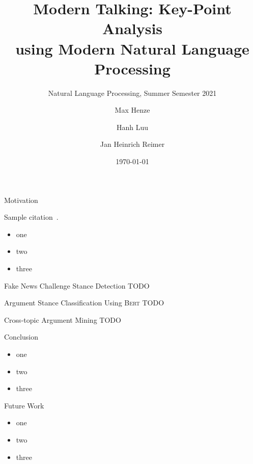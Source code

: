 \documentclass[english,handout]{mlutalk}
\title{%
  Modern Talking: Key-Point Analysis \\
  using Modern Natural Language Processing
}
\subtitle{Natural Language Processing, Summer Semester 2021}
\author{Max Henze \and Hanh Luu \and Jan Heinrich Reimer}
\institute{Martin Luther University Halle-Wittenberg}
\date{\today}
\newcommand{\Bert}{\textsc{Bert}\xspace}
\begin{document}
\titleframe

\begin{frame}{Motivation}
  \begin{example}
    Sample citation~\cite{Bar-HaimEFKLS2020}.
  \end{example}
  \begin{itemize}
    \item one
    \item two
    \item three
  \end{itemize}
\end{frame}

\begin{frame}{Fake News Challenge Stance Detection}
  TODO
\end{frame}

\begin{frame}{Argument Stance Classification Using \Bert}
  TODO
\end{frame}

\begin{frame}{Cross-topic Argument Mining}
  TODO
\end{frame}

\begin{frame}{Conclusion}
  \begin{itemize}
    \item one
    \item two
    \item three
  \end{itemize}
\end{frame}

\begin{frame}{Future Work}
  \begin{itemize}
    \item one
    \item two
    \item three
  \end{itemize}
  \thankyou
\end{frame}

\appendix
\section{\appendixname}

\bibliographyframe
\end{document}
